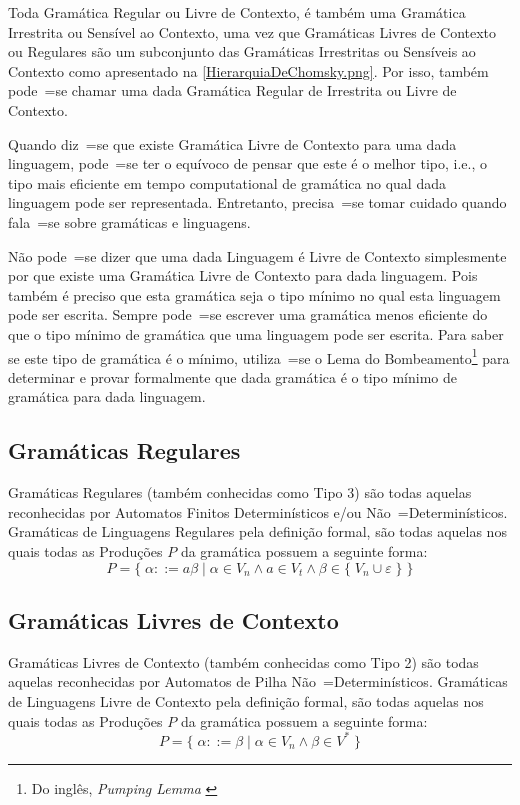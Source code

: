     Toda Gramática Regular ou
    Livre de Contexto,
    é também uma Gramática Irrestrita ou
    Sensível ao Contexto,
    uma vez que Gramáticas Livres de Contexto ou
    Regulares são um subconjunto das Gramáticas Irrestritas ou
    Sensíveis ao Contexto como apresentado na \autoref{HierarquiaDeChomsky.png}.
    Por isso,
    também pode~=se chamar uma dada Gramática Regular de Irrestrita ou
    Livre de Contexto.

    Quando diz~=se que existe Gramática Livre de Contexto para uma dada linguagem,
    pode~=se ter o equívoco de pensar que este é o melhor tipo,
    i.e.,
    o tipo mais eficiente em tempo computational de gramática no qual dada linguagem pode ser representada.
    Entretanto,
    precisa~=se tomar cuidado quando fala~=se sobre gramáticas e
    linguagens.

    Não pode~=se dizer que uma dada Linguagem é Livre de Contexto simplesmente por que existe uma Gramática Livre de Contexto para dada linguagem.
    Pois também é preciso que esta gramática seja o tipo mínimo no qual esta linguagem pode ser escrita.
    Sempre pode~=se escrever uma gramática menos eficiente do que o tipo mínimo de gramática que uma linguagem pode ser escrita.
    Para saber se este tipo de gramática é o mínimo,
    utiliza~=se o Lema do Bombeamento\footnote{
    Do inglês, \textit{Pumping Lemma} \cite{hopcroftBook,sipserBook}
    }
    para determinar e
    provar formalmente que dada gramática é o tipo mínimo de gramática para dada linguagem.


\subsection{Gramáticas Regulares}

    Gramáticas Regulares (também conhecidas como Tipo 3) são todas aquelas reconhecidas por Automatos Finitos Determinísticos e\slash{}ou Não~=Determinísticos.
    Gramáticas de Linguagens Regulares pela definição formal,
    são todas aquelas nos quais todas as Produções $P$ da gramática possuem a seguinte forma:
    $$ P = \{\; \alpha ::= a \beta \;|\; \alpha \in V_n \land a \in V_t
                \land \beta \in \{\; V_n \cup \varepsilon\; \} \;\} $$

\subsection{Gramáticas Livres de Contexto}

    Gramáticas Livres de Contexto (também conhecidas como Tipo 2) \cite{hopcroftBook} são todas aquelas reconhecidas por Automatos de Pilha Não~=Determinísticos.
    Gramáticas de Linguagens Livre de Contexto pela definição formal,
    são todas aquelas nos quais todas as Produções $P$ da gramática possuem a seguinte forma:
    $$ P = \{\; \alpha ::= \beta \;|\; \alpha \in V_n \land \beta \in V^* \;\} $$


